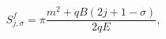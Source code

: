 \begin{equation}
S^{f}_{j,\sigma} = \pi \frac{m^2 + qB (2 j+ 1 - \sigma)}{2qE}, \label{inst2}
\end{equation}

